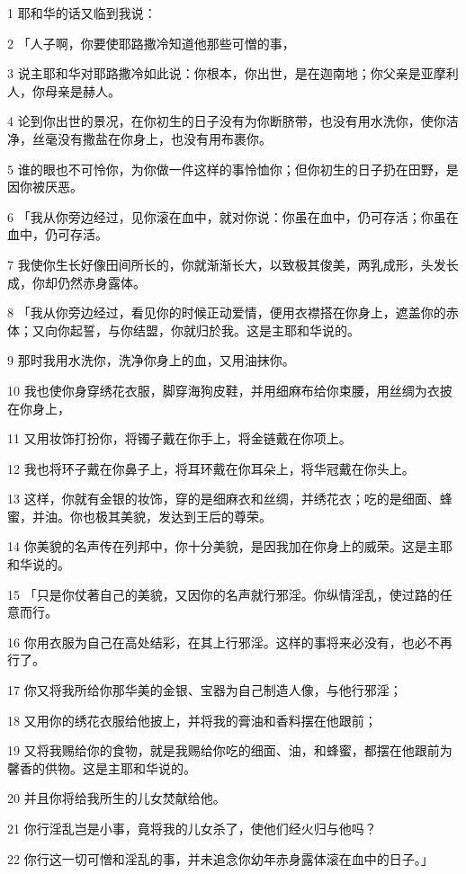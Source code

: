 \par 1 耶和华的话又临到我说：
\par 2 「人子啊，你要使耶路撒冷知道他那些可憎的事，
\par 3 说主耶和华对耶路撒冷如此说：你根本，你出世，是在迦南地；你父亲是亚摩利人，你母亲是赫人。
\par 4 论到你出世的景况，在你初生的日子没有为你断脐带，也没有用水洗你，使你洁净，丝毫没有撒盐在你身上，也没有用布裹你。
\par 5 谁的眼也不可怜你，为你做一件这样的事怜恤你；但你初生的日子扔在田野，是因你被厌恶。
\par 6 「我从你旁边经过，见你滚在血中，就对你说：你虽在血中，仍可存活；你虽在血中，仍可存活。
\par 7 我使你生长好像田间所长的，你就渐渐长大，以致极其俊美，两乳成形，头发长成，你却仍然赤身露体。
\par 8 「我从你旁边经过，看见你的时候正动爱情，便用衣襟搭在你身上，遮盖你的赤体；又向你起誓，与你结盟，你就归於我。这是主耶和华说的。
\par 9 那时我用水洗你，洗净你身上的血，又用油抹你。
\par 10 我也使你身穿绣花衣服，脚穿海狗皮鞋，并用细麻布给你束腰，用丝绸为衣披在你身上，
\par 11 又用妆饰打扮你，将镯子戴在你手上，将金链戴在你项上。
\par 12 我也将环子戴在你鼻子上，将耳环戴在你耳朵上，将华冠戴在你头上。
\par 13 这样，你就有金银的妆饰，穿的是细麻衣和丝绸，并绣花衣；吃的是细面、蜂蜜，并油。你也极其美貌，发达到王后的尊荣。
\par 14 你美貌的名声传在列邦中，你十分美貌，是因我加在你身上的威荣。这是主耶和华说的。
\par 15 「只是你仗著自己的美貌，又因你的名声就行邪淫。你纵情淫乱，使过路的任意而行。
\par 16 你用衣服为自己在高处结彩，在其上行邪淫。这样的事将来必没有，也必不再行了。
\par 17 你又将我所给你那华美的金银、宝器为自己制造人像，与他行邪淫；
\par 18 又用你的绣花衣服给他披上，并将我的膏油和香料摆在他跟前；
\par 19 又将我赐给你的食物，就是我赐给你吃的细面、油，和蜂蜜，都摆在他跟前为馨香的供物。这是主耶和华说的。
\par 20 并且你将给我所生的儿女焚献给他。
\par 21 你行淫乱岂是小事，竟将我的儿女杀了，使他们经火归与他吗？
\par 22 你行这一切可憎和淫乱的事，并未追念你幼年赤身露体滚在血中的日子。」
